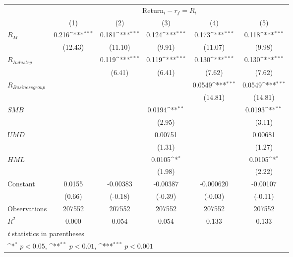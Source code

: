 {
\def\sym#1{\ifmmode^{#1}\else\(^{#1}\)\fi}
\begin{tabular}{l*{5}{c}}
\hline\hline
                &\multicolumn{5}{c}{ $ \text{Return}_i - r_f = R_i$ }                                          \\\cmidrule(lr){2-6}
                &\multicolumn{1}{c}{(1)}         &\multicolumn{1}{c}{(2)}         &\multicolumn{1}{c}{(3)}         &\multicolumn{1}{c}{(4)}         &\multicolumn{1}{c}{(5)}         \\
\hline
 $ R_M $        &    0.216\sym{***}&    0.181\sym{***}&    0.124\sym{***}&    0.173\sym{***}&    0.118\sym{***}\\
                &  (12.43)         &  (11.10)         &   (9.91)         &  (11.07)         &   (9.98)         \\
[1em]
 $ R_{Industry} $ &                  &    0.119\sym{***}&    0.119\sym{***}&    0.130\sym{***}&    0.130\sym{***}\\
                &                  &   (6.41)         &   (6.41)         &   (7.62)         &   (7.62)         \\
[1em]
 $ R_{Business group} $ &                  &                  &                  &   0.0549\sym{***}&   0.0549\sym{***}\\
                &                  &                  &                  &  (14.81)         &  (14.81)         \\
[1em]
 $ SMB $        &                  &                  &   0.0194\sym{**} &                  &   0.0193\sym{**} \\
                &                  &                  &   (2.95)         &                  &   (3.11)         \\
[1em]
 $ UMD $        &                  &                  &  0.00751         &                  &  0.00681         \\
                &                  &                  &   (1.31)         &                  &   (1.27)         \\
[1em]
 $ HML $        &                  &                  &   0.0105\sym{*}  &                  &   0.0105\sym{*}  \\
                &                  &                  &   (1.98)         &                  &   (2.22)         \\
[1em]
Constant        &   0.0155         & -0.00383         & -0.00387         &-0.000620         & -0.00107         \\
                &   (0.66)         &  (-0.18)         &  (-0.39)         &  (-0.03)         &  (-0.11)         \\
\hline
Observations    &   207552         &   207552         &   207552         &   207552         &   207552         \\
\(R^{2}\)       &    0.000         &    0.054         &    0.054         &    0.133         &    0.133         \\
\hline\hline
\multicolumn{6}{l}{\footnotesize \textit{t} statistics in parentheses}\\
\multicolumn{6}{l}{\footnotesize \sym{*} \(p<0.05\), \sym{**} \(p<0.01\), \sym{***} \(p<0.001\)}\\
\end{tabular}
}
